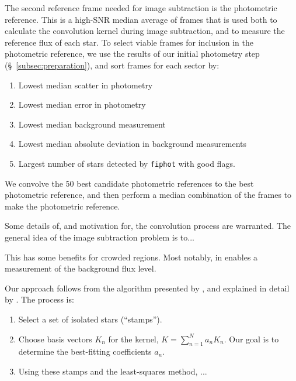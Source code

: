 \documentclass[12pt,twocolumn,tighten]{aastex62}
\begin{document}
The second reference frame needed for image subtraction is the
photometric reference.
This is a high-SNR median average of frames that is used both to
calculate the convolution kernel during image subtraction, and to
measure the reference flux of each star.
To select viable frames for inclusion in the photometric reference, we
use the results of our initial photometry step
(\S~\ref{subsec:preparation}), and sort frames for each sector by:
\begin{enumerate}
  \item Lowest median scatter in photometry
  \item Lowest median error in photometry
  \item Lowest median background measurement
  \item Lowest median absolute deviation in background measurements
  \item Largest number of stars detected by \texttt{fiphot} with good
    flags.
\end{enumerate}
We convolve the 50 best candidate photometric references to the best
photometric reference, and then perform a median combination of the
frames to make the photometric reference.


Some details of, and motivation for, the convolution process are warranted.
The general idea of the image subtraction problem is to...

This has some benefits for crowded regions. Most notably, in enables a
measurement of the background flux level.

Our approach follows from the algorithm presented by
\citet{Alard_Lupton_1998}, and explained in detail by
\citet{miller_optimal_2008}.
The process is: %
\begin{enumerate}
  \item Select a set of isolated stars (``stamps'').
  \item Choose basis vectors $K_n$ for the kernel, $K = \sum_{n=1}^N
    a_n K_n$. Our goal is to determine the best-fitting coefficients
    $a_n$. 
  \item Using these stamps and the least-squares method, ...
\end{enumerate}
\end{document}
